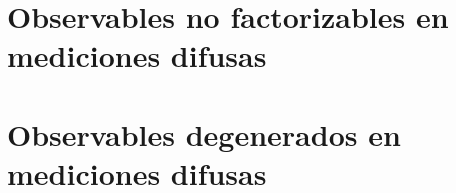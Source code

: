 \begin{comment}
$(\Leftarrow)$ Suponiendo que se cumple que \[ \left\langle\lambda_j\left|\permut{l}{\prodtensor A_i}\right|\lambda_k\right\rangle=0, \forall j\neq k, \forall \Pi_l \in \mathcal{S},\] se puede  escribir a la permutación $l$ como una combinación lineal de los operadores de proyección\[\permut{l}{\prodtensor A_i}=\sum_{\lambda_k \in \Lambda}d_{lk}P_{k}.\]Entonces en el valor esperado ({\ref{eq:valor-esperado-2instrumentnp}})
 \[\begin{split}\left \la \prodtensor A_i \right \ra_{\mathcal{I}_2}&=\sum_{\lambda_j\in \Lambda} \tr\left(\sum_{l}p_l{\sum_{\lambda_k \in \Lambda}d_{lk}P_{\lambda_k}}P_{\lambda_j}\right) \tr\left(P_{\lambda_j}\rho\right)\\ &=\sum_{\lambda_j\in \Lambda} \sum_{l}p_l d_{lj}\tr\left(P_{\lambda_j}\right)\\ &=\sum_{l}p_l \tr\left( \sum_{\lambda_j\in \Lambda} d_{lj}P_{\lambda_j}\rho\right)\\ &=\sum_{l}p_l\tr\left(\permut{l}{\prodtensor A_i}\rho\right)\\ 
    &=\tr\left(\fuzzy{\prodtensor A_i}\rho\right)=\left \la \prodtensor A_i \right \ra_{\mathcal{I}_1}
\end{split}\]

\end{proof}
\end{comment}
\section{Observables no factorizables en mediciones difusas}
\section{Observables degenerados en mediciones difusas}

